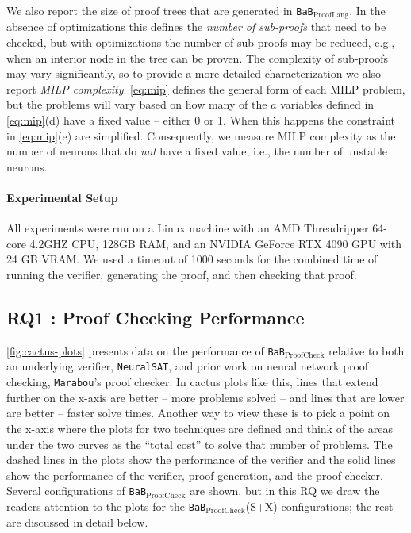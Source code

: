 \documentclass[oneside,11pt,dvipsnames]{book}
\newcommand{\ignore}[1]{}
\newcommand{\prooflang}{\texttt{BaB$_{\text{ProofLang}}$}}
\newcommand{\proofcheck}{\texttt{BaB$_{\text{ProofCheck}}$}}
\newcommand{\marabou}{\texttt{Marabou}}
\newcommand{\neuralsat}{\texttt{NeuralSAT}}
\begin{document}
We also report the size of proof trees that are generated in \prooflang{}.
In the absence of optimizations this defines the \textit{number of sub-proofs}
that need to be checked, but with optimizations the number of sub-proofs may
be reduced, e.g., when an interior node in the tree can be proven.
The complexity of  sub-proofs
may vary significantly, so to provide a more detailed characterization we
also report \textit{MILP complexity}.  \autoref{eq:mip} defines the general form
of each MILP problem, but the problems will vary based on how many of the $a$ variables
defined in \autoref{eq:mip}(d) have a fixed value -- either 0 or 1.   When this
happens the constraint in \autoref{eq:mip}(e) are simplified.
Consequently, we measure MILP complexity as the number of neurons that do \textit{not}
have a fixed value, i.e., the number of unstable neurons.  
\ignore{This does not account for the contribution of \autoref{eq:mip}a,b which is directly
related to network size and input/output dimension.   Is there any way to measure that?}

\paragraph{Experimental Setup}
All experiments were run on a Linux machine with an AMD Threadripper 64-core 4.2GHZ CPU, 128GB RAM, and an NVIDIA GeForce RTX 4090 GPU with 24 GB VRAM. 
We used a timeout of 1000 seconds for the combined time of running the verifier,
generating the proof, and then checking that proof.

\subsection{RQ1 : Proof Checking Performance}
\label{sec:rq1}
\autoref{fig:cactus-plots} presents data on the performance
of \proofcheck{} relative to both an underlying verifier, \neuralsat{}, and prior work on neural network proof checking, \marabou{}'s proof checker.  
In cactus plots like this, lines that extend further on the x-axis
are better -- more problems solved -- and lines that are lower are better -- faster solve times.
Another way to view these is to pick a point on the x-axis where the plots for two techniques are defined and think of the areas under the two curves as the ``total cost'' to solve that number of problems.
The dashed lines in the plots show the performance of the verifier and the solid lines show the performance of the verifier, proof generation, and the proof checker.  Several configurations of
\proofcheck{} are shown, but in this RQ we draw the readers attention
to the plots for the \proofcheck{}(S+X) configurations; the rest are discussed in detail below.
\end{document}
